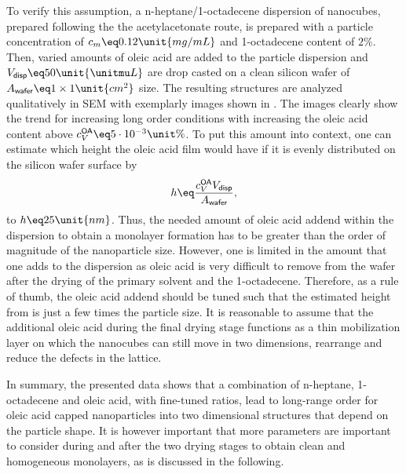 \documentclass[\main/dresen_thesis.tex]{subfiles}
\begin{document}
    To verify this assumption, a n-heptane/1-octadecene dispersion of nanocubes, prepared following the the acetylacetonate route, is prepared with a particle concentration of $c_m \eq 0.12 \unit{mg/mL}$ and 1-octadecene content of $2\unit{\%}$.
    Then, varied amounts of oleic acid are added to the particle dispersion and $V_\textsf{disp} \eq 50 \unit{\unitmu L}$ are drop casted on a clean silicon wafer of $ A_\textsf{wafer} \eq 1 \times 1 \unit{cm^2}$ size.
    The resulting structures are analyzed qualitatively in SEM with exemplarly images shown in .
    The images clearly show the trend for increasing long order conditions with increasing the oleic acid content above $c_V^\textsf{OA} \eq 5\cdot10^{-3} \unit{\%}$.
    To put this amount into context, one can estimate which height the oleic acid film would have if it is evenly distributed on the silicon wafer surface by
    \begin{align}
      h \eq \frac{c_V^\textsf{OA} V_\textsf{disp}}{A_\textsf{wafer}}, \label{eq:monolayers:preparation:solventVariation:OAAddend}
    \end{align}
    to $h \eq 25 \unit{nm}$.
    Thus, the needed amount of oleic acid addend within the dispersion to obtain a monolayer formation has to be greater than the order of magnitude of the nanoparticle size.
    However, one is limited in the amount that one adds to the dispersion as oleic acid is very difficult to remove from the wafer after the drying of the primary solvent and the 1-octadecene.
    Therefore, as a rule of thumb, the oleic acid addend should be tuned such that the estimated height from  is just a few times the particle size.
    It is reasonable to assume that the additional oleic acid during the final drying stage functions as a thin mobilization layer on which the nanocubes can still move in two dimensions, rearrange and reduce the defects in the lattice.

    In summary, the presented data shows that a combination of n-heptane, 1-octadecene and oleic acid, with fine-tuned ratios, lead to long-range order for oleic acid capped nanoparticles into two dimensional structures that depend on the particle shape.
    It is however important that more parameters are important to consider during and after the two drying stages to obtain clean and homogeneous monolayers, as is discussed in the following.
\end{document}
